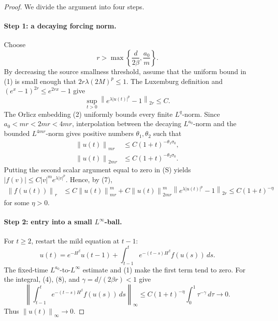 \documentclass[11pt]{article}
\newcommand{\norm}[1]{\left\lVert #1\right\rVert}
\begin{document}
\begin{proof}
We divide the argument into four steps.

\paragraph{Step 1: a decaying forcing norm.}
Choose
\[
 r>\max\left\{\frac d{2\beta},\frac{a_0}{m}\right\}.
\]
By decreasing the source smallness threshold, assume that the uniform bound
in (1) is small enough that
\(2r\lambda(2M)^p\leq1\).  The Luxemburg definition and
\((e^x-1)^{2r}\leq e^{2rx}-1\) give
\begin{equation}
 \sup_{t>0}\norm{e^{\lambda|u(t)|^p}-1}_{2r}\leq C.    \tag{7}
\end{equation}
The Orlicz embedding (2) uniformly bounds every finite \(L^q\)-norm.
Since \(a_0<mr<2mr<4mr\), interpolation between the decaying
\(L^{a_0}\)-norm and the bounded \(L^{4mr}\)-norm gives positive numbers
\(\theta_1,\theta_2\) such that
\begin{align*}
 \norm{u(t)}_{mr}&\leq C(1+t)^{-\theta_1\sigma_0},\\
 \norm{u(t)}_{2mr}&\leq C(1+t)^{-\theta_2\sigma_0}.
\end{align*}
Putting the second scalar argument equal to zero in (S) yields
\(|f(v)|\leq C|v|^m e^{\lambda|v|^p}\).  Hence, by (7),
\begin{align}
 \norm{f(u(t))}_r
 &\leq C\norm{u(t)}_{mr}^m
 +C\norm{u(t)}_{2mr}^m
       \norm{e^{\lambda|u(t)|^p}-1}_{2r}
 \leq C(1+t)^{-\eta}                                  \tag{8}
\end{align}
for some \(\eta>0\).

\paragraph{Step 2: entry into a small \(L^\infty\)-ball.}
For \(t\geq2\), restart the mild equation at \(t-1\):
\[
 u(t)=e^{-H^\beta}u(t-1)
 +\int_{t-1}^t e^{-(t-s)H^\beta}f(u(s))\,ds.           \tag{9}
\]
The fixed-time \(L^{a_0}\)-to-\(L^\infty\) estimate and (1) make the
first term tend to zero.  For the integral, (4), (8), and
\(\gamma=d/(2\beta r)<1\) give
\[
 \left\lVert\int_{t-1}^t e^{-(t-s)H^\beta}f(u(s))\,ds
 \right\rVert_\infty
 \leq C(1+t)^{-\eta}\int_0^1\tau^{-\gamma}\,d\tau
 \longrightarrow0.                                    \tag{10}
\]
Thus \(\norm{u(t)}_\infty\to0\).


\end{proof}
\end{document}
